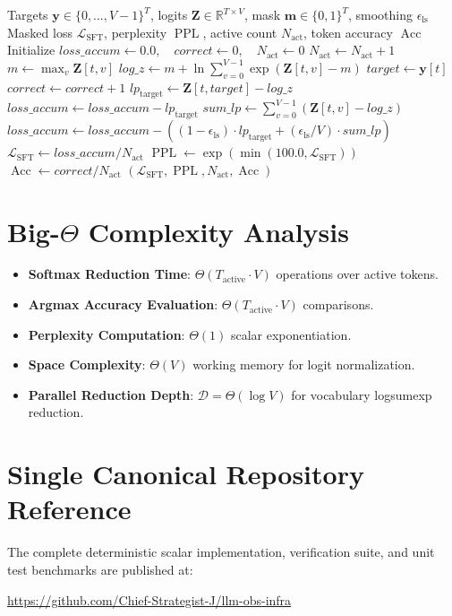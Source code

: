\documentclass[11pt,a4paper]{article}
\theoremstyle{definition}
\begin{document}
\begin{algorithm}[H]
\caption{Masked SFT Loss Evaluation and Perplexity Tracking}
\begin{algorithmic}[1]
\Require Targets $\mathbf{y} \in \{0, \dots, V-1\}^T$, logits $\mathbf{Z} \in \mathbb{R}^{T \times V}$, mask $\mathbf{m} \in \{0, 1\}^T$, smoothing $\epsilon_{\text{ls}}$
\Ensure Masked loss $\mathcal{L}_{\text{SFT}}$, perplexity $\operatorname{PPL}$, active count $N_{\text{act}}$, token accuracy $\operatorname{Acc}$
\State Initialize $loss\_accum \gets 0.0, \quad correct \gets 0, \quad N_{\text{act}} \gets 0$
        \State $N_{\text{act}} \gets N_{\text{act}} + 1$
        \State $m \gets \max_{v} \mathbf{Z}[t, v]$
        \State $log\_z \gets m + \ln \sum_{v=0}^{V-1} \exp(\mathbf{Z}[t, v] - m)$
        \State $target \gets \mathbf{y}[t]$
            \State $correct \gets correct + 1$
        \EndIf
        \State $lp_{\text{target}} \gets \mathbf{Z}[t, target] - log\_z$
            \State $loss\_accum \gets loss\_accum - lp_{\text{target}}$
        \Else
            \State $sum\_lp \gets \sum_{v=0}^{V-1} (\mathbf{Z}[t, v] - log\_z)$
            \State $loss\_accum \gets loss\_accum - ((1 - \epsilon_{\text{ls}}) \cdot lp_{\text{target}} + (\epsilon_{\text{ls}} / V) \cdot sum\_lp)$
        \EndIf
    \EndIf
\EndFor
\State $\mathcal{L}_{\text{SFT}} \gets loss\_accum / N_{\text{act}}$
\State $\operatorname{PPL} \gets \exp(\min(100.0, \mathcal{L}_{\text{SFT}}))$
\State $\operatorname{Acc} \gets correct / N_{\text{act}}$
\State \Return $(\mathcal{L}_{\text{SFT}}, \operatorname{PPL}, N_{\text{act}}, \operatorname{Acc})$
\end{algorithmic}
\end{algorithm}

\section{Big-$\Theta$ Complexity Analysis}

\begin{itemize}
    \item \textbf{Softmax Reduction Time}: $\Theta(T_{\text{active}} \cdot V)$ operations over active tokens.
    \item \textbf{Argmax Accuracy Evaluation}: $\Theta(T_{\text{active}} \cdot V)$ comparisons.
    \item \textbf{Perplexity Computation}: $\Theta(1)$ scalar exponentiation.
    \item \textbf{Space Complexity}: $\Theta(V)$ working memory for logit normalization.
    \item \textbf{Parallel Reduction Depth}: $\mathcal{D} = \Theta(\log V)$ for vocabulary logsumexp reduction.
\end{itemize}

\section{Single Canonical Repository Reference}

The complete deterministic scalar implementation, verification suite, and unit test benchmarks are published at:
\begin{center}
\url{https://github.com/Chief-Strategist-J/llm-obs-infra}
\end{center}
\end{document}
